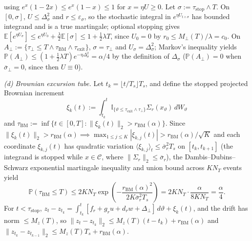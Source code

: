 using \(e^x(1 - 2x) \le e^x(1 - x) \le 1\) for \(x = \eta U \ge 0\). Let \(\sigma := \tau_{\mathrm{stop}}\wedge T\). On \([0,\sigma]\), \(U \le \Delta_\sigma^2\) and \(r \le \varepsilon_\sigma\), so the stochastic integral in \(e^{\eta U_{t\wedge\sigma}}\) has bounded integrand and is a true martingale; optional stopping gives \(\mathbb{E}[e^{\eta U_\sigma}] \le e^{\eta U_0} + \frac{\lambda}{2}\mathbb{E}[\sigma] \le 1 + \frac12\lambda T\), since \(U_0 = 0\) by \(r_0 \le M_\perp(T)/\lambda = c_0\). On \(A_\perp := \{\tau_\perp \le T\wedge\tau_{\mathrm{BM}}\wedge\tau_{\mathrm{exit}}\}\), \(\sigma = \tau_\perp\) and \(U_\sigma = \Delta_\sigma^2\); Markov's inequality yields \(\mathbb{P}(A_\perp) \le (1 + \frac12\lambda T)e^{-\eta\Delta_\sigma^2} = \alpha/4\) by the definition of \(\Delta_\sigma\) (\(\mathbb{P}(A_\perp) = 0\) when \(\overline\sigma_\perp = 0\), since then \(U \equiv 0\)).

\emph{(d) Brownian excursion tube.} Let \(t_k = \lfloor t/T_s\rfloor T_s\), and define the stopped projected Brownian increment
\[
\xi_k(t) := \int_{t_k}^t \mathbb{I}_{\{\vartheta \le \tau_{\mathrm{exit}}\wedge\tau_\perp\}}\Sigma_r(x_\vartheta)\,dW_\vartheta
\]
and \(\tau_{\mathrm{BM}} := \inf\{t \in [0,T] : \|\xi_k(t)\|_2 > r_{\mathrm{BM}}(\alpha)\}\). Since \(\|\xi_k(t)\|_2 > r_{\mathrm{BM}}(\alpha) \implies \max_{1 \le j \le K} |\xi_{k,j}(t)| > r_{\mathrm{BM}}(\alpha)/\sqrt{K}\) and each coordinate \(\xi_{k,j}(t)\) has quadratic variation \(\langle \xi_{k,j} \rangle_t \le \overline{\sigma}_r^2 T_s\) on \([t_k, t_{k+1}]\) (the integrand is stopped while \(x \in \mathcal{C}\), where \(\|\Sigma_r\|_2 \le \overline\sigma_r\)), the Dambis--Dubins--Schwarz exponential martingale inequality and union bound across \(K N_T\) events yield
\[
\mathbb{P}(\tau_{\mathrm{BM}} \le T) \le 2 K N_T \exp\!\left( -\frac{r_{\mathrm{BM}}(\alpha)^2}{2 K \overline{\sigma}_r^2 T_s} \right) = 2 K N_T \cdot \frac{\alpha}{8 K N_T} = \frac{\alpha}{4}.
\]
For \(t < \tau_{\mathrm{stop}}\), \(z_t - z_{t_k} = \int_{t_k}^t[f_r + g_ru + d_rw + \Delta_\perp]\,d\vartheta + \xi_k(t)\), and the drift has norm \(\le M_z(T)\), so \(\|z_t - z_{t_k}\|_2 \le M_z(T)(t - t_k) + r_{\mathrm{BM}}(\alpha)\) and \(\|z_{t_k} - z_{t_{k-1}}\|_2 \le M_z(T)T_s + r_{\mathrm{BM}}(\alpha)\).

